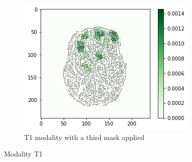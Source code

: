 \begin{figure}[H]
    \begin{subfigure}[t]{.27\textwidth}
        \centering
        \includegraphics[width=\linewidth]{chapters/06_hdm/c_Brats18_2013_17_1_L1/44.png}
        \caption{T1 modality with a third mask applied}
    \end{subfigure}
    \caption{Modality T1}
\end{figure}

